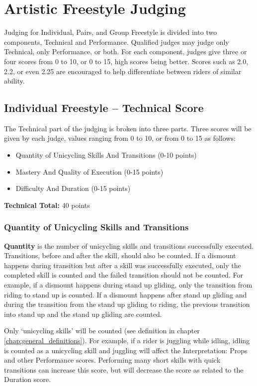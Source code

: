 \section{Artistic Freestyle Judging}
Judging for Individual, Pairs, and Group Freestyle is divided into two components, Technical and Performance.
Qualified judges may judge only Technical, only Performance, or both.
For each component, judges give three or four scores from 0 to 10, or 0 to 15, high scores being better.
Scores such as 2.0, 2.2, or even 2.25 are encouraged to help differentiate between riders of similar ability.

\subsection{Individual Freestyle -- Technical Score \label{sec:freestyle_individual-technical-score}}
The Technical part of the judging is broken into three parts.
Three scores will be given by each judge, values ranging from 0 to 10, or from 0 to 15 as follows: 
\begin{itemize}
\item Quantity of Unicycling Skills And Transitions (0-10 points) 
\item Mastery And Quality of Execution (0-15 points) 
\item Difficulty And Duration (0-15 points) 
\end{itemize}
\textbf{Technical Total:} 40 points

\subsubsection{Quantity of Unicycling Skills and Transitions}
\textbf{Quantity} is the number of unicycling skills and transitions successfully executed.
Transitions, before and after the skill, should also be counted.
If a dismount happens during transition but after a skill was successfully executed, only the completed skill is counted and the failed transition should not be counted.
For example, if a dismount happens during stand up gliding, only the transition from riding to stand up is counted.
If a dismount happens after stand up gliding and during the transition from the stand up gliding to riding, the previous transition into stand up and the stand up gliding are counted.

Only `unicycling skills' will be counted (see definition in chapter \ref{chap:general_definitions}).
For example, if a rider is juggling while idling, idling is counted as a unicycling skill and juggling will affect the Interpretation: Props and other Performance scores.
Performing many short skills with quick transitions can increase this score, but will decrease the score as related to the Duration score.

